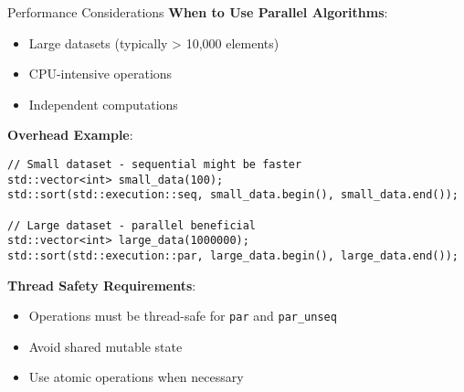 \begin{frame}[fragile]{Performance Considerations}
	\textbf{When to Use Parallel Algorithms}:
	\begin{itemize}
		\item Large datasets (typically > 10,000 elements)
		\item CPU-intensive operations
		\item Independent computations
	\end{itemize}

	\textbf{Overhead Example}:
	\begin{verbatim}
// Small dataset - sequential might be faster
std::vector<int> small_data(100);
std::sort(std::execution::seq, small_data.begin(), small_data.end());

// Large dataset - parallel beneficial
std::vector<int> large_data(1000000);
std::sort(std::execution::par, large_data.begin(), large_data.end());
	\end{verbatim}

	\textbf{Thread Safety Requirements}:
	\begin{itemize}
		\item Operations must be thread-safe for \texttt{par} and \texttt{par\_unseq}
		\item Avoid shared mutable state
		\item Use atomic operations when necessary
	\end{itemize}
\end{frame}

